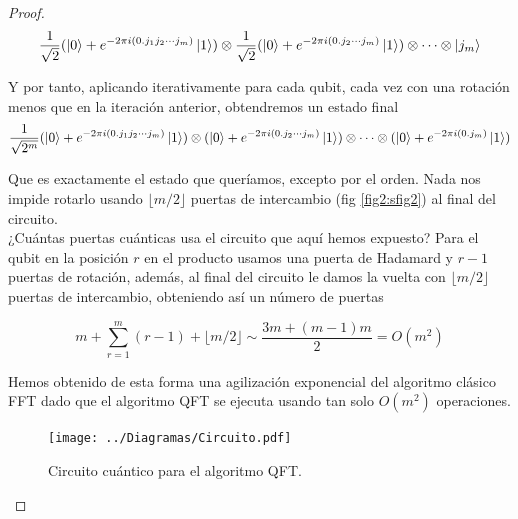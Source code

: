 \documentclass[11pt, spanish]{report}
\numberwithin{equation}{section}
\numberwithin{defin}{section}
\begin{document}
\begin{proof}
\begin{equation}
\frac{1}{\sqrt{2}}(\ket{0}+e^{-2\pi i(0.j_1j_2\cdots j_m)}\ket{1})\otimes\frac{1}{\sqrt{2}}(\ket{0}+e^{-2\pi i(0.j_2\cdots j_m)}\ket{1})\otimes\cdots\otimes\ket{j_m}
\end{equation}

Y por tanto, aplicando iterativamente para cada qubit, cada vez con una rotación menos que en la iteración anterior, obtendremos un estado final
\begin{equation}
\frac{1}{\sqrt{2^m}}(\ket{0}+e^{-2\pi i(0.j_1j_2\cdots j_m)}\ket{1})\otimes(\ket{0}+e^{-2\pi i(0.j_2\cdots j_m)}\ket{1})\otimes\cdots\otimes(\ket{0}+e^{-2\pi i(0.j_m)}\ket{1})
\end{equation}

Que es exactamente el estado que queríamos, excepto por el orden. Nada nos impide rotarlo usando $\lfloor m/2 \rfloor$ puertas de intercambio (fig \ref{fig2:sfig2}) al final del circuito.\\

¿Cuántas puertas cuánticas usa el circuito que aquí hemos expuesto? Para el qubit en la posición $r$ en el producto usamos una puerta de Hadamard y $r-1$ puertas de rotación, además, al final del circuito le damos la vuelta con $\lfloor m/2 \rfloor$ puertas de intercambio, obteniendo así un número de puertas

\begin{equation}
m+\sum_{r=1}^m (r-1)+\lfloor m/2 \rfloor \sim \frac{3m+(m-1)m}{2}=O(m^2)
\end{equation}

Hemos obtenido de esta forma una agilización exponencial del algoritmo clásico FFT dado que el algoritmo QFT se ejecuta usando tan solo $O(m^2)$ operaciones.

\begin{figure}[]
  \centering
  \texttt{[image: ../Diagramas/Circuito.pdf]}
  \caption{Circuito cuántico para el algoritmo QFT.}
\end{figure}
\end{proof}
\end{document}
